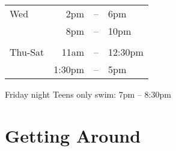 \documentclass[9pt,twoside,openright,final,article,letterpaper]{memoir}
\let\oldsection=\section
\renewcommand{\section}[1]{%
  \nopagebreak
  \vspace{6pt} %
  \needspace{1.5in}
  \oldsection{#1}
  \nopagebreak}
\begin{document}
\begin{multicols}{2}
\begin{center}
  \begin{tabular}{lrcl}
    \hline
    Wed & 2pm & -- & 6pm \\
    & 8pm & -- & 10pm \\
    \\
    Thu-Sat  & 11am & -- & 12:30pm \\
    & 1:30pm & -- & 5pm \\
    \hline
  \end{tabular}
\end{center}

Friday night Teens only swim: 7pm -- 8:30pm

\end{multicols}

\vfill
\pagestyle{headings}
\thispagestyle{headings}
\newpage

\section{Getting Around}
\end{document}
